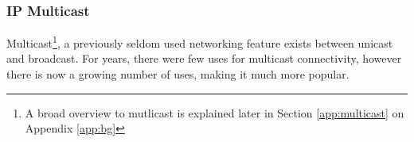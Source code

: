 \subsubsection{IP Multicast}

Multicast\footnote{A broad overview to mutlicast is explained later in Section \ref{app:multicast} on Appendix \ref{app:bg}}, 
a previously seldom used networking feature exists between unicast and 
broadcast. For years, there were few uses for multicast connectivity, 
however there is now a growing number of uses, making it much more 
popular. 

